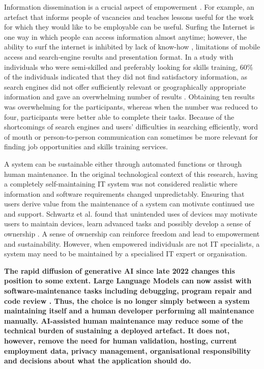 Information dissemination is a crucial aspect of empowerment \cite{chepken2012tele}. For example, an artefact that informs people of vacancies and teaches lessons useful for the work for which they would like to be employable can be useful. Surfing the Internet is one way in which people can access information almost anytime; however, the ability to surf the internet is inhibited by lack of know-how \cite{lorini2014}, limitations of mobile access and search-engine results and presentation format. In a study with individuals who were semi-skilled and preferably looking for skills training, 60\% of the individuals indicated that they did not find satisfactory information, as search engines did not offer sufficiently relevant or geographically appropriate information and gave an overwhelming number of results \cite{paihama2016}. Obtaining ten results was overwhelming for the participants, whereas when the number was reduced to four, participants were better able to complete their tasks. Because of the shortcomings of search engines and users’ difficulties in searching efficiently, word of mouth or person-to-person communication can sometimes be more relevant for finding job opportunities and skills training services.

A system can be sustainable either through automated functions or through human maintenance. In the original technological context of this research, having a completely self-maintaining IT system was not considered realistic where information and software requirements changed unpredictably. Ensuring that users derive value from the maintenance of a system can motivate continued use and support. Schwartz et al. found that unintended uses of devices may motivate users to maintain devices, learn advanced tasks and possibly develop a sense of ownership \cite{schwartz2013}. A sense of ownership can reinforce freedom and lead to empowerment and sustainability. However, when empowered individuals are not IT specialists, a system may need to be maintained by a specialised IT expert or organisation.

\textbf{The rapid diffusion of generative AI since late 2022 changes this position to some extent. Large Language Models can now assist with software-maintenance tasks including debugging, program repair and code review \cite{hou2024}. Thus, the choice is no longer simply between a system maintaining itself and a human developer performing all maintenance manually. AI-assisted human maintenance may reduce some of the technical burden of sustaining a deployed artefact. It does not, however, remove the need for human validation, hosting, current employment data, privacy management, organisational responsibility and decisions about what the application should do.}

